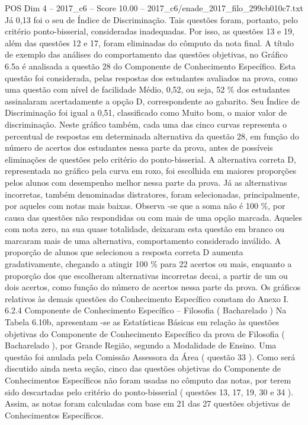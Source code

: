 \begin{textsample}{POS Dim 4 – 2017\_c6 – Score 10.00 – 2017\_c6/enade\_2017\_filo\_299cb010c7.txt}
Já 0,13 foi o seu de Índice de Discriminação.
Tais questões foram, portanto, pelo critério ponto-bisserial, consideradas inadequadas.
Por isso, as questões 13 e 19, além das questões 12 e 17, foram eliminadas do cômputo da nota final.
A título de exemplo das análises do comportamento das questões objetivas, no Gráfico 6.5a é analisada a questão 28 do Componente de Conhecimento Específico.
Esta questão foi considerada, pelas respostas dos estudantes avaliados na prova, como uma questão com nível de facilidade Médio, 0,52, ou seja, 52 \% dos estudantes assinalaram acertadamente a opção D, correspondente ao gabarito.
Seu Índice de Discriminação foi igual a 0,51, classificado como Muito bom, o maior valor de discriminação.
Neste gráfico também, cada uma das cinco curvas representa o percentual de respostas em determinada alternativa da questão 28, em função do número de acertos dos estudantes nessa parte da prova, antes de possíveis eliminações de questões pelo critério do ponto-bisserial.
A alternativa correta D, representada no gráfico pela curva em roxo, foi escolhida em maiores proporções pelos alunos com desempenho melhor nessa parte da prova.
Já as alternativas incorretas, também denominadas distratores, foram selecionadas, principalmente, por aqueles com notas mais baixas.
Observa -se que a soma não é 100 \%, por causa das questões não respondidas ou com mais de uma opção marcada.
Aqueles com nota zero, na sua quase totalidade, deixaram esta questão em branco ou marcaram mais de uma alternativa, comportamento considerado inválido.
A proporção de alunos que selecionou a resposta correta D aumenta gradativamente, chegando a atingir 100 \% para 22 acertos ou mais, enquanto a proporção dos que escolheram alternativas incorretas decai, a partir de um ou dois acertos, como função do número de acertos nessa parte da prova.
Os gráficos relativos às demais questões do Conhecimento Específico constam do Anexo I. 6.2.4 Componente de Conhecimento Específico – Filosofia ( Bacharelado ) Na Tabela 6.10b, apresentam -se as Estatísticas Básicas em relação às questões objetivas do Componente de Conhecimento Específico da prova de Filosofia ( Bacharelado ), por Grande Região, segundo a Modalidade de Ensino.
Uma questão foi anulada pela Comissão Assessora da Área ( questão 33 ).
Como será discutido ainda nesta seção, cinco das questões objetivas do Componente de Conhecimentos Específicos não foram usadas no cômputo das notas, por terem sido descartadas pelo critério do ponto-bisserial ( questões 13, 17, 19, 30 e 34 ).
Assim, as notas foram calculadas com base em 21 das 27 questões objetivas de Conhecimentos Específicos.

\end{textsample}
